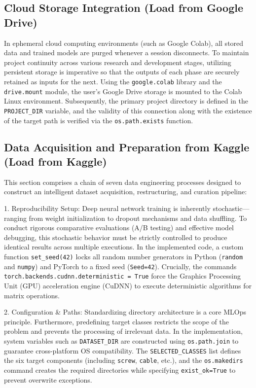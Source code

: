 \documentclass{article}
\begin{document}
\subsection{Cloud Storage Integration (Load from Google Drive)}

In ephemeral cloud computing environments (such as Google Colab), all stored data and trained models are purged whenever a session disconnects. To maintain project continuity across various research and development stages, utilizing persistent storage is imperative so that the outputs of each phase are securely retained as inputs for the next.
Using the \texttt{google.colab} library and the \texttt{drive.mount} module, the user's Google Drive storage is mounted to the Colab Linux environment. Subsequently, the primary project directory is defined in the \texttt{PROJECT\_DIR} variable, and the validity of this connection along with the existence of the target path is verified via the \texttt{os.path.exists} function.

\subsection{Data Acquisition and Preparation from Kaggle (Load from Kaggle)}

This section comprises a chain of seven data engineering processes designed to construct an intelligent dataset acquisition, restructuring, and curation pipeline:

\vspace{0.3cm}
1. Reproducibility Setup:
Deep neural network training is inherently stochastic—ranging from weight initialization to dropout mechanisms and data shuffling. To conduct rigorous comparative evaluations (A/B testing) and effective model debugging, this stochastic behavior must be strictly controlled to produce identical results across multiple executions. In the implemented code, a custom function \texttt{set\_seed(42)} locks all random number generators in Python (\texttt{random} and \texttt{numpy}) and PyTorch to a fixed seed (\texttt{Seed=42}). Crucially, the commands \texttt{torch.backends.cudnn.deterministic = True} force the Graphics Processing Unit (GPU) acceleration engine (CuDNN) to execute deterministic algorithms for matrix operations.

\vspace{0.3cm}
2. Configuration \& Paths:
Standardizing directory architecture is a core MLOps principle. Furthermore, predefining target classes restricts the scope of the problem and prevents the processing of irrelevant data. In the implementation, system variables such as \texttt{DATASET\_DIR} are constructed using \texttt{os.path.join} to guarantee cross-platform OS compatibility. The \texttt{SELECTED\_CLASSES} list defines the six target components (including \texttt{screw}, \texttt{cable}, etc.), and the \texttt{os.makedirs} command creates the required directories while specifying \texttt{exist\_ok=True} to prevent overwrite exceptions.
\end{document}
